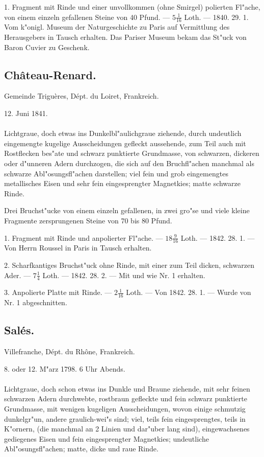 \documentclass[a4paper, 11pt, oneside, polutonikogreek, german]{article}
\begin{document}
1. Fragment mit Rinde und einer unvollkommen (ohne Smirgel) polierten Fl"ache, von einem einzeln gefallenen Steine von 40 Pfund. --- $5\frac{1}{16}$ Loth. --- 1840. 29. 1. Vom k"onigl. Museum der Naturgeschichte zu Paris auf Vermittlung des Herausgebers in Tausch erhalten. Das Pariser Museum bekam das St"uck von Baron Cuvier zu Geschenk.
\subsection{Château-Renard.}
\begin{center}
\small
Gemeinde Triguères, Dépt. du Loiret, Frankreich.

12. Juni 1841.
\end{center}
\paragraph{}
Lichtgraue, doch etwas ins Dunkelbl"aulichgraue ziehende, durch undeutlich eingemengte kugelige Ausscheidungen gefleckt aussehende, zum Teil auch mit Rostflecken bes"ate und schwarz punktierte Grundmasse, von schwarzen, dickeren oder d"unneren Adern durchzogen, die sich auf den Bruchfl"achen manchmal als schwarze Abl"osungsfl"achen darstellen; viel fein und grob eingemengtes metallisches Eisen und sehr fein eingesprengter Magnetkies; matte schwarze Rinde.

Drei Bruchst"ucke von einem einzeln gefallenen, in zwei gro"se und viele kleine Fragmente zersprungenen Steine von 70 bis 80 Pfund.

1. Fragment mit Rinde und anpolierter Fl"ache. --- $18\frac{9}{16}$ Loth. --- 1842. 28. 1. --- Von Herrn Roussel in Paris in Tausch erhalten.

2. Scharfkantiges Bruchst"uck ohne Rinde, mit einer zum Teil dicken, schwarzen Ader. --- $7\frac{1}{4}$ Loth. --- 1842. 28. 2. --- Mit und wie Nr. 1 erhalten.

3. Anpolierte Platte mit Rinde. --- $2\frac{1}{16}$ Loth. --- Von 1842. 28. 1. --- Wurde von Nr. 1 abgeschnitten.
\subsection{Salés.}
\begin{center}
\small
Villefranche, Dépt. du Rhône, Frankreich.

8. oder 12. M"arz 1798. 6 Uhr Abends.
\end{center}
\paragraph{}
Lichtgraue, doch schon etwas ins Dunkle und Braune ziehende, mit sehr feinen schwarzen Adern durchwebte, rostbraun gefleckte und fein schwarz punktierte Grundmasse, mit wenigen kugeligen Ausscheidungen, wovon einige schmutzig dunkelgr"un, andere graulich-wei"s sind; viel, teils fein eingesprengtes, teils in K"ornern, (die manchmal an 2 Linien und dar"uber lang sind), eingewachsenes gediegenes Eisen und fein eingesprengter Magnetkies; undeutliche Abl"osungsfl"achen; matte, dicke und raue Rinde.
\end{document}
